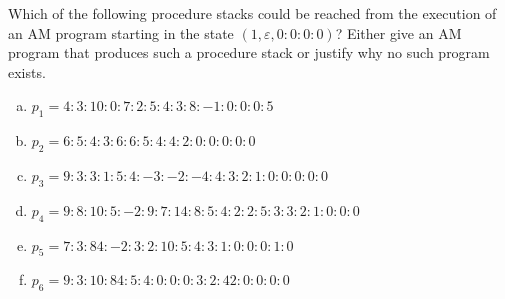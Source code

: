 \begin{exercise}{30}
  Which of the following procedure stacks could be reached from the execution of an AM program starting in the state $(1, \varepsilon, 0 : 0 : 0 : 0)$? Either give an AM program that produces such a procedure stack or justify why no such program exists.

  \begin{enumerate}[(a)]
    \item $p_1 = 4 : 3 : 10: 0 : 7 : 2 : 5 : 4 : 3 : 8 : -1: 0 : 0 : 0 : 5$
    \item $p_2 = 6 : 5 : 4 : 3 : 6 : 6 : 5 : 4 : 4 : 2 : 0 : 0 : 0 : 0 : 0$
    \item $p_3 = 9 : 3 : 3 : 1 : 5 : 4 : -3: -2: -4: 4 : 3 : 2 : 1 : 0 : 0 : 0 : 0 : 0$
    \item $p_4 = 9 : 8 : 10: 5 : -2: 9 : 7 : 14: 8 : 5 : 4 : 2 : 2 : 5 : 3 : 3 : 2 : 1 : 0 : 0 : 0$
    \item $p_5 = 7 : 3 : 84: -2: 3 : 2 : 10: 5 : 4 : 3 : 1 : 0 : 0 : 0 : 1 : 0 $
    \item $p_6 = 9 : 3 : 10: 84: 5 : 4 : 0 : 0 : 0 : 3 : 2 : 42: 0 : 0 : 0 : 0$
  \end{enumerate}
\end{exercise}

